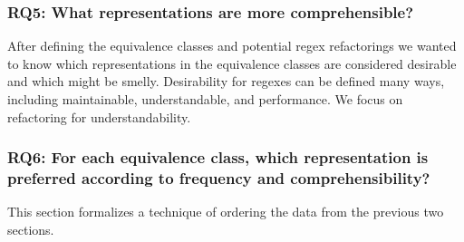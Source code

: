 \subsubsection{RQ5: What representations are more comprehensible?}

After defining the equivalence classes and potential  regex refactorings we wanted to know which representations in the equivalence classes  are considered desirable and which might be smelly. Desirability for regexes can be defined many ways, including maintainable,  understandable, and performance.
We focus on refactoring for understandability.

\subsubsection{RQ6: For each equivalence class, which representation is preferred according to frequency and comprehensibility?}

This section formalizes a technique of ordering the data from the previous two sections.


